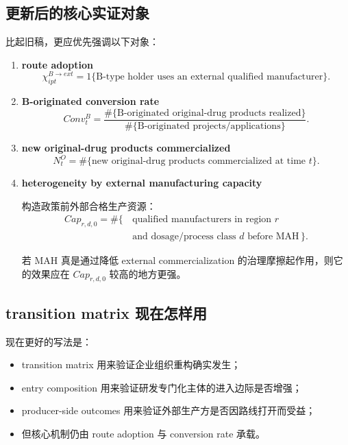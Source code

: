 \documentclass[12pt,fontset=none]{ctexart}
\begin{document}
\subsection{更新后的核心实证对象}

比起旧稿，更应优先强调以下对象：

\begin{enumerate}
    \item \textbf{route adoption}
    \[
    \chi_{ipt}^{B\to ext}=1\{\text{B-type holder uses an external qualified manufacturer}\}.
    \]

    \item \textbf{B-originated conversion rate}
    \[
    Conv_t^B=
    \frac{\#\{\text{B-originated original-drug products realized}\}}
         {\#\{\text{B-originated projects/applications}\}}.
    \]

    \item \textbf{new original-drug products commercialized}
    \[
    N_t^O=\#\{\text{new original-drug products commercialized at time } t\}.
    \]

    \item \textbf{heterogeneity by external manufacturing capacity}

    构造政策前外部合格生产资源：
    \[
    \begin{aligned}
    Cap_{r,d,0}
    =
    \#\bigl\{\,&\text{qualified manufacturers in region } r \\
    &\text{and dosage/process class } d \text{ before MAH}\,\bigr\}.
    \end{aligned}
    \]

    若 MAH 真是通过降低 external commercialization 的治理摩擦起作用，则它的效果应在 $Cap_{r,d,0}$ 较高的地方更强。
\end{enumerate}

\subsection{transition matrix 现在怎样用}

现在更好的写法是：
\begin{itemize}
    \item transition matrix 用来验证企业组织重构确实发生；
    \item entry composition 用来验证研发专门化主体的进入边际是否增强；
    \item producer-side outcomes 用来验证外部生产方是否因路线打开而受益；
    \item 但核心机制仍由 route adoption 与 conversion rate 承载。
\end{itemize}
\end{document}
